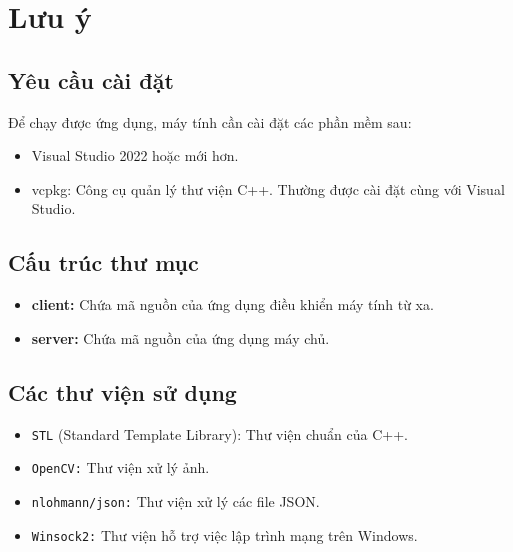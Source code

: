 \section{Lưu ý}
\subsection{Yêu cầu cài đặt}

Để chạy được ứng dụng, máy tính cần cài đặt các phần mềm sau:
\begin{itemize}
    \item Visual Studio 2022 hoặc mới hơn.
    \item vcpkg: Công cụ quản lý thư viện C++. Thường được cài đặt cùng với Visual Studio.
\end{itemize}

\subsection{Cấu trúc thư mục}
\begin{itemize}
    \item \textbf{client:} Chứa mã nguồn của ứng dụng điều khiển máy tính từ xa.
    \item \textbf{server:} Chứa mã nguồn của ứng dụng máy chủ.
\end{itemize}

\subsection{Các thư viện sử dụng}
\begin{itemize}
    \item \texttt{STL} (Standard Template Library): Thư viện chuẩn của C++.
    \item \texttt{OpenCV:} Thư viện xử lý ảnh.
    \item \texttt{nlohmann/json:} Thư viện xử lý các file JSON.
    \item \texttt{Winsock2:} Thư viện hỗ trợ việc lập trình mạng trên Windows.
\end{itemize}